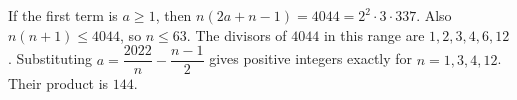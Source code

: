 If the first term is $a\ge1$, then $n(2a+n-1)=4044=2^2\cdot3\cdot337$. Also $n(n+1)\le4044$, so $n\le63$. The divisors of $4044$ in this range are $1,2,3,4,6,12$. Substituting $a=\dfrac{2022}{n}-\dfrac{n-1}{2}$ gives positive integers exactly for $n=1,3,4,12$. Their product is $\boxed{144}$.
